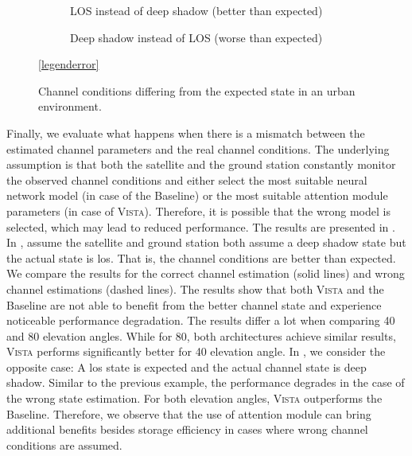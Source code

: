 \documentclass[conference]{IEEEtran}
\newcommand\ours{\textsc{Vista}\xspace}
\newcommand\baseline{Baseline\xspace}
\begin{document}
\begin{figure}[t!]
  \begin{subfigure}{.48\linewidth}
  \centering
  
  \caption{LOS instead of deep shadow (better than expected)}
  \label{fig:different_state_same_snr_better}
\end{subfigure}
\hfill
\begin{subfigure}{.48\linewidth}
  \centering
  
  \caption{Deep shadow instead of LOS (worse than expected)}
  \label{fig:different_state_same_snr_worse}
\end{subfigure}

\vspace{1em}
\centering
\ref{legenderror}

\caption{Channel conditions differing from the expected state in an urban environment.}
\label{fig:different_state_same_snr}
\end{figure}

Finally, we evaluate what happens when there is a mismatch between the estimated channel parameters and the real channel conditions. 
The underlying assumption is that both the satellite and the ground station constantly monitor the observed channel conditions and either select the most suitable neural network model (in case of the \baseline) or the most suitable attention module parameters (in case of \ours).
Therefore, it is possible that the wrong model is selected, which may lead to reduced performance.
The results are presented in .
In , assume the satellite and ground station both assume a deep shadow state but the actual state is \ac{los}. 
That is, the channel conditions are better than expected. 
We compare the results for the correct channel estimation (solid lines) and wrong channel estimations (dashed lines).
The results show that both \ours and the \baseline are not able to benefit from the better channel state and experience noticeable performance degradation.
The results differ a lot when comparing 40\textdegree{} and 80\textdegree{} elevation angles.
While for 80\textdegree{}, both architectures achieve similar results, 
\ours performs significantly better for 40\textdegree{} elevation angle.
In , we consider the opposite case: 
A \ac{los} state is expected and the actual channel state is deep shadow. 
Similar to the previous example, the performance degrades in the case of the wrong state estimation.
For both elevation angles, \ours outperforms the \baseline.
Therefore, we observe that the use of attention module can bring additional benefits besides storage efficiency in cases where wrong channel conditions are assumed.
\end{document}
